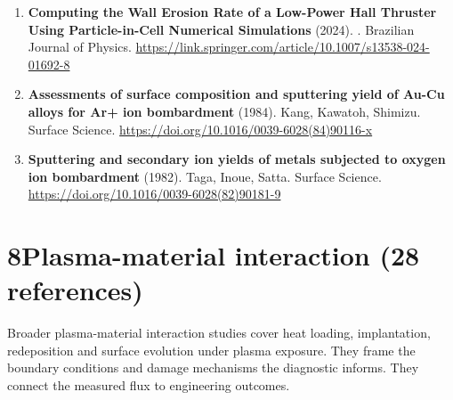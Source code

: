 \documentclass[11pt,a4paper]{article}
\begin{document}
\begin{enumerate}[leftmargin=1.4em]
\item \textbf{Computing the Wall Erosion Rate of a Low-Power Hall Thruster Using Particle-in-Cell Numerical Simulations} (2024). . Brazilian Journal of Physics. \url{https://link.springer.com/article/10.1007/s13538-024-01692-8}
\item \textbf{Assessments of surface composition and sputtering yield of Au-Cu alloys for Ar+ ion bombardment} (1984). Kang, Kawatoh, Shimizu. Surface Science. \url{https://doi.org/10.1016/0039-6028(84)90116-x}
\item \textbf{Sputtering and secondary ion yields of metals subjected to oxygen ion bombardment} (1982). Taga, Inoue, Satta. Surface Science. \url{https://doi.org/10.1016/0039-6028(82)90181-9}
\end{enumerate}

\section*{8\quad Plasma-material interaction \textnormal{(\normalsize 28 references)}}
Broader plasma-material interaction studies cover heat loading, implantation, redeposition and surface evolution under plasma exposure. They frame the boundary conditions and damage mechanisms the diagnostic informs. They connect the measured flux to engineering outcomes.
\end{document}
